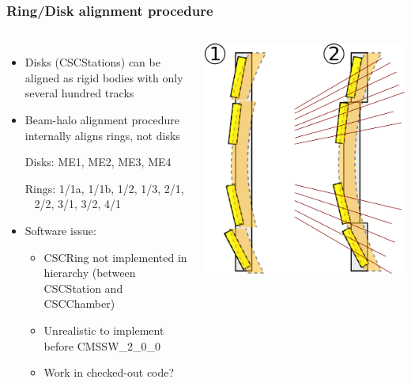 \documentclass[compress]{beamer}
\begin{document}
\begin{frame}
\frametitle{Ring/Disk alignment procedure}
\begin{columns}
\begin{itemize}
\item Disks (CSCStations) can be aligned as rigid bodies with only several hundred tracks
\item Beam-halo alignment procedure internally aligns rings, not disks

\vspace{0.1 cm}
Disks: \hfill ME1, ME2, ME3, ME4

Rings: \hfill 1/1a, 1/1b, 1/2, 1/3, 2/1, \\ \mbox{ } \hfill 2/2, 3/1, 3/2, 4/1\textcolor{white}{,}

\item Software issue:
\begin{itemize}
\item CSCRing not implemented in hierarchy (between CSCStation and CSCChamber)
\item Unrealistic to implement before CMSSW\_2\_0\_0
\item Work in checked-out code?
\end{itemize}
\end{itemize}

\includegraphics[width=\linewidth]{plan2.png}
\end{columns}
\end{frame}
\end{document}
